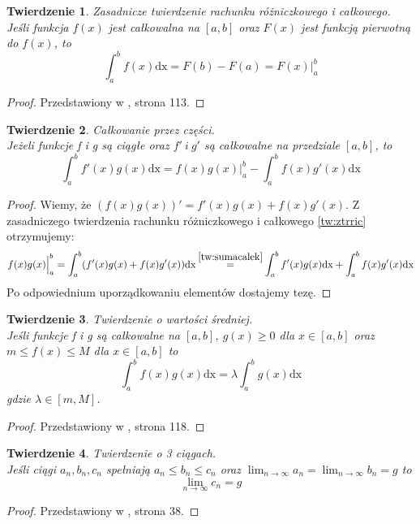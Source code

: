 \documentclass[11pt,wide]{article}
\newcommand\numeq[1]%
  {\stackrel{\scriptscriptstyle \mkern-1.5mu#1\mkern-1.5mu }{=}}
\newtheorem{thm}{Twierdzenie}
\begin{document}
\begin{thm} \label{tw:ztrric}
Zasadnicze twierdzenie rachunku różniczkowego i całkowego.\\
Jeśli funkcja \(f(x)\) jest całkowalna na \([a,b]\) oraz \(F(x)\) jest funkcją pierwotną do \(f(x)\), to
\begin{equation} 
\int_a^b f(x)\mathrm{dx} = F(b) - F(a) = F(x) \Big|_{a}^{b}
\end{equation}
\end{thm}
\begin{proof}
Przedstawiony w \cite{Szwarc}, strona 113.
\end{proof}

\begin{thm} \label{tw:czesci}
Całkowanie przez części. \\
Jeżeli funkcje f i g są ciągłe oraz \(f'~i~g' \) są całkowalne na przedziale \([a,b]\), to
\begin{equation} 
\int_a^b f'(x)g(x) \mathrm{dx} = f(x)g(x)\Big|_{a}^{b} - \int_a^b f(x)g'(x) \mathrm{dx}
\end{equation}
\end{thm}
\begin{proof}
Wiemy, że \( (f(x)g(x))' = f'(x)g(x) + f(x)g'(x)\). Z zasadniczego twierdzenia rachunku różniczkowego i całkowego \eqref{tw:ztrric} otrzymujemy:
\begin{equation} 
f(x)g(x)\Big|_{a}^{b} = \int_a^b (f'(x)g(x) + f(x)g'(x)) \mathrm{dx} \numeq{\eqref{tw:sumacalek}} \int_a^b f'(x)g(x) \mathrm{dx}
+ \int_a^b f(x)g'(x) \mathrm{dx}
\end{equation}
Po odpowiednium uporządkowaniu elementów dostajemy tezę.
\end{proof}

\begin{thm} \label{tw:wartsred}
Twierdzenie o wartości średniej.\\
Jeśli funkcje f i g są całkowalne na \([a,b]\), \(g(x) \geq ­0\) dla \(x \in [a,b]\) oraz \(m \leq f(x) \leq M\) dla \(x \in [a,b]\) to
\begin{equation} 
\int_a^b f(x)g(x) \mathrm{dx} = \lambda \int_a^b g(x) \mathrm{dx}
\end{equation}
gdzie \(\lambda \in [m, M]\).
\end{thm}
\begin{proof}
Przedstawiony w \cite{Szwarc}, strona 118.
\end{proof}

\begin{thm} \label{tw:otrzechciagach}
Twierdzenie o 3 ciągach.\\
Jeśli ciągi \(a_n, b_n, c_n\) spełniają \(a_n \leq b_n \leq c_n \) oraz \(\lim_{n\to \infty}a_n = \lim_{n\to \infty}b_n = g\) to
\begin{equation} 
\lim_{n\to \infty}c_n = g
\end{equation}
\end{thm}
\begin{proof}
Przedstawiony w \cite{Paluszynski}, strona 38.
\end{proof}
\end{document}
